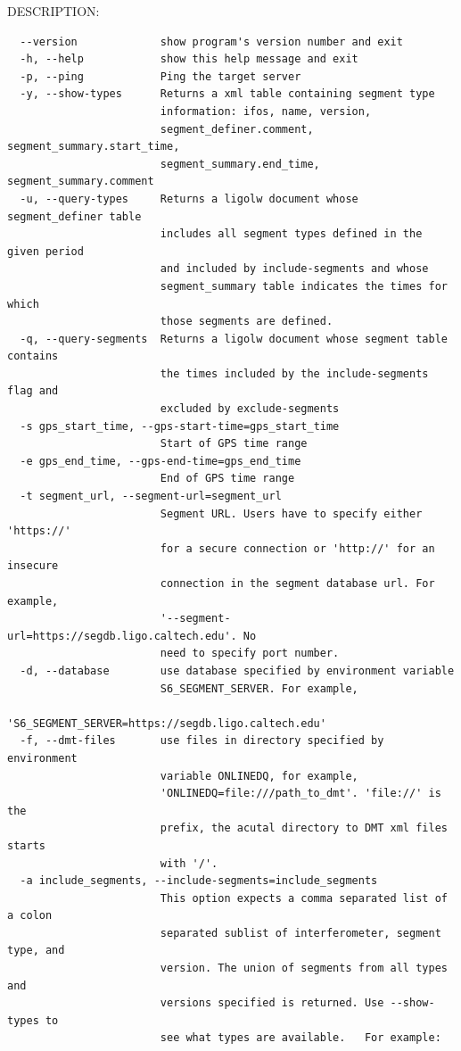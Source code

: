 DESCRIPTION:
{\small
\begin{verbatim}
  --version             show program's version number and exit
  -h, --help            show this help message and exit
  -p, --ping            Ping the target server
  -y, --show-types      Returns a xml table containing segment type
                        information: ifos, name, version,
                        segment_definer.comment, segment_summary.start_time,
                        segment_summary.end_time, segment_summary.comment
  -u, --query-types     Returns a ligolw document whose segment_definer table
                        includes all segment types defined in the given period
                        and included by include-segments and whose
                        segment_summary table indicates the times for which
                        those segments are defined.
  -q, --query-segments  Returns a ligolw document whose segment table contains
                        the times included by the include-segments flag and
                        excluded by exclude-segments
  -s gps_start_time, --gps-start-time=gps_start_time
                        Start of GPS time range
  -e gps_end_time, --gps-end-time=gps_end_time
                        End of GPS time range
  -t segment_url, --segment-url=segment_url
                        Segment URL. Users have to specify either 'https://'
                        for a secure connection or 'http://' for an insecure
                        connection in the segment database url. For example,
                        '--segment-url=https://segdb.ligo.caltech.edu'. No
                        need to specify port number.
  -d, --database        use database specified by environment variable
                        S6_SEGMENT_SERVER. For example,
                        'S6_SEGMENT_SERVER=https://segdb.ligo.caltech.edu'
  -f, --dmt-files       use files in directory specified by environment
                        variable ONLINEDQ, for example,
                        'ONLINEDQ=file:///path_to_dmt'. 'file://' is the
                        prefix, the acutal directory to DMT xml files starts
                        with '/'.
  -a include_segments, --include-segments=include_segments
                        This option expects a comma separated list of a colon
                        separated sublist of interferometer, segment type, and
                        version. The union of segments from all types and
                        versions specified is returned. Use --show-types to
                        see what types are available.   For example:

\end{verbatim}}

